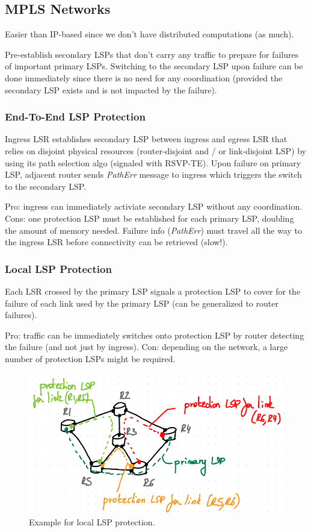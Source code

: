 \subsection{MPLS Networks}

Easier than IP-based since we don't have distributed computations (as much).

Pre-establish secondary LSPs that don't carry any traffic to prepare for failures of important primary LSPs. Switching to the secondary LSP upon failure can be done immediately since there is no need for any coordination (provided the secondary LSP exists and is not impacted by the failure).

\subsubsection{End-To-End LSP Protection}

Ingress LSR establishes secondary LSP between ingress and egress LSR that relies on disjoint physical resources (router-disjoint and / or link-disjoint LSP) by using its path selection algo (signaled with RSVP-TE). Upon failure on primary LSP, adjacent router sends \textit{PathErr} message to ingress which triggers the switch to the secondary LSP.

Pro: ingress can immediately activiate secondary LSP without any coordination. Cons: one protection LSP must be established for each primary LSP, doubling the amount of memory needed. Failure info (\textit{PathErr}) must travel all the way to the ingress LSR before connectivity can be retrieved (slow!).


\subsubsection{Local LSP Protection}

Each LSR crossed by the primary LSP signals a protection LSP to cover for the failure of each link used by the primary LSP (can be generalized to router failures).

Pro: traffic can be immediately switches onto protection LSP by router detecting the failure (and not just by ingress). Con: depending on the network, a large number of protection LSPs might be required.

\begin{figure}[h]
	\centering
	\includegraphics[scale=0.5]{images/4-local.PNG}
	\caption{Example for local LSP protection.}
	\label{fig:local}
\end{figure}